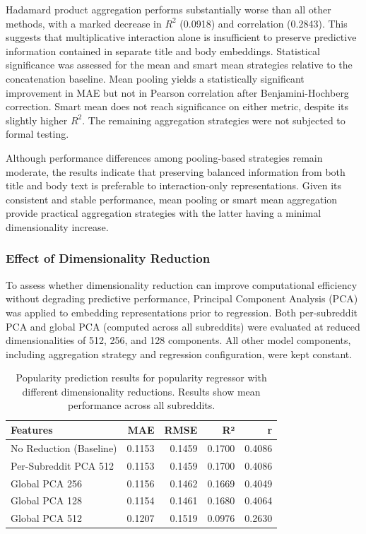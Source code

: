 Hadamard product aggregation performs substantially worse than all other methods, with a marked decrease in $R^2$ (0.0918) and correlation (0.2843). This suggests that multiplicative interaction alone is insufficient to preserve predictive information contained in separate title and body embeddings. Statistical significance was assessed for the mean and smart mean strategies relative to the concatenation baseline. Mean pooling yields a statistically significant improvement in MAE but not in Pearson correlation after Benjamini-Hochberg correction. Smart mean does not reach significance on either metric, despite its slightly higher $R^2$. The remaining aggregation strategies were not subjected to formal testing.

Although performance differences among pooling-based strategies remain moderate, the results indicate that preserving balanced information from both title and body text is preferable to interaction-only representations. Given its consistent and stable performance, mean pooling or smart mean aggregation provide practical aggregation strategies with the latter having a minimal dimensionality increase.

\subsubsection*{Effect of Dimensionality Reduction}

To assess whether dimensionality reduction can improve computational efficiency without degrading predictive performance, Principal Component Analysis (PCA) was applied to embedding representations prior to regression. Both per-subreddit PCA and global PCA (computed across all subreddits) were evaluated at reduced dimensionalities of 512, 256, and 128 components. All other model components, including aggregation strategy and regression configuration, were kept constant.

\begin{table}[htbp]
\centering
\caption{Popularity prediction results for popularity regressor with different dimensionality reductions. Results show mean performance across all subreddits.}
\label{tab:dimensionality_reduction}
\begin{tabular}{lrrrr}\toprule
Features & MAE & RMSE & R² & r  \\
\midrule
No Reduction (Baseline) & 0.1153 & 0.1459 & 0.1700 & 0.4086  \\
Per-Subreddit PCA 512 & 0.1153 & 0.1459 & 0.1700 & 0.4086  \\
Global PCA 256 & 0.1156 & 0.1462 & 0.1669 & 0.4049  \\
Global PCA 128 & 0.1154 & 0.1461 & 0.1680 & 0.4064  \\
Global PCA 512 & 0.1207 & 0.1519 & 0.0976 & 0.2630  \\
\bottomrule
\end{tabular}
\end{table}


